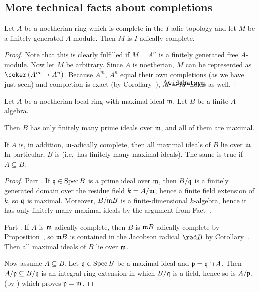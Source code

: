 \documentclass[a4paper,parskip=half,numbers=enddot, DIV=12]{scrreprt}
\begin{document}
%
\subsection{More technical facts about completions}
\begin{prop}
	Let $A$ be a noetherian ring which is complete in the $I$-adic topology and let $M$ be a finitely generated $A$-module. Then $M$ is $I$-adically complete.
\end{prop}
\begin{proof}
	Note that this is clearly fulfilled if $M=A^n$ is a finitely generated free $A$-module. Now let $M$ be arbitrary. Since $A$ is noetherian, $M$ can be represented as $\coker\left(A^m\morphism A^n\right)$. Because $A^m$, $A^n$ equal their own completions (as we have just seen) and  completion is exact (by Corollary~), $M=\roof{M}$ holds as well.
\end{proof}
\begin{cor}
	Let $A$ be a noetherian local ring with maximal ideal $\mathfrak{m}$. Let $B$ be a finite $A$-algebra.
	\begin{alphanumerate}
		\item Then $B$ has only finitely many prime ideals over $\mathfrak{m}$, and all of them are maximal.
		\item If $A$ is, in addition, $\mathfrak{m}$-adically complete, then all maximal ideals of $B$ lie over $\mathfrak{m}$. In particular, $B$ is  (i.e.\ has finitely many maximal ideals). The same is true if $A\subseteq B$.
	\end{alphanumerate}
\end{cor}
\begin{proof}
	Part . If $\mathfrak{q}\in\operatorname{Spec} B$ is a prime ideal over $\mathfrak{m}$, then $B/\mathfrak{q}$ is a finitely generated domain over the residue field $k=A/\mathfrak{m}$, hence a finite field extension of $k$, so $\mathfrak{q}$ is maximal. Moreover, $B/\mathfrak{m} B$ is a finite-dimensional $k$-algebra, hence it has only finitely many maximal ideals by the argument from Fact~.
	
	Part . If $A$ is $\mathfrak{m}$-adically complete, then $B$ is $\mathfrak{m} B$-adically complete by Proposition~, so $\mathfrak{m} B$ is contained in the Jacobson radical $\rad B$ by Corollary~. Then all maximal ideals of $B$ lie over $\mathfrak{m}$.
	
	Now assume $A\subseteq B$. Let $\mathfrak{q}\in\operatorname{Spec} B$ be a maximal ideal and $\mathfrak{p}=\mathfrak{q}\cap A$. Then $A/\mathfrak{p}\subseteq B/\mathfrak{q}$ is an integral ring extension in which $B/\mathfrak{q}$ is a field, hence so is $A/\mathfrak{p}$, (by \cite[Proposition~1.5.1]{alg1}) which proves $\mathfrak{p}=\mathfrak{m}$.
\end{proof}
\end{document}
